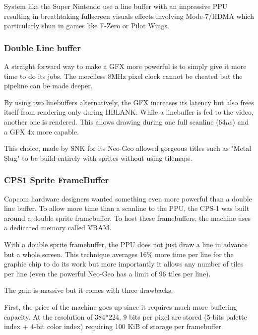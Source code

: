 System like the Super Nintendo use a line buffer with an impressive PPU resulting in breathtaking fullscreen visuals effects involving Mode-7/HDMA which particularly shun in games like F-Zero or Pilot Wings.








\subsubsection{Double Line buffer}
A straight forward way to make a GFX more powerful is to simply give it more time to do its jobs. The merciless 8MHz pixel clock cannot be cheated but the pipeline can be made deeper.

By using two linebuffers alternatively, the GFX increases its latency but also frees itself from rendering only during HBLANK. While a linebuffer is fed to the video, another one is rendered. This allows drawing during one full scanline (64$\mu$s) and a GFX 4x more capable. 

This choice, made by SNK for its Neo-Geo allowed gorgeous titles such as "Metal Slug" to be build entirely with sprites without using tilemaps.




\subsubsection{CPS1 Sprite FrameBuffer}
Capcom hardware designers wanted something even more powerful than a double line buffer. To allow more time than a scanline to the PPU, the CPS-1 was built around a double sprite framebuffer. To host these framebuffers, the machine uses a dedicated memory called VRAM.

With a double sprite framebuffer, the PPU does not just draw a line in advance but a whole screen. This technique averages 16\% more time per line for the graphic chip to do its work but more importantly it allows any number of tiles per line (even the powerful Neo-Geo has a limit of 96 tiles per line).

The gain is massive but it comes with three drawbacks. 

First, the price of the machine goes up since it requires much more buffering capacity. At the resolution of 384*224, 9 bits per pixel are stored (5-bits palette index + 4-bit color index) requiring 100 KiB of storage per framebuffer.


